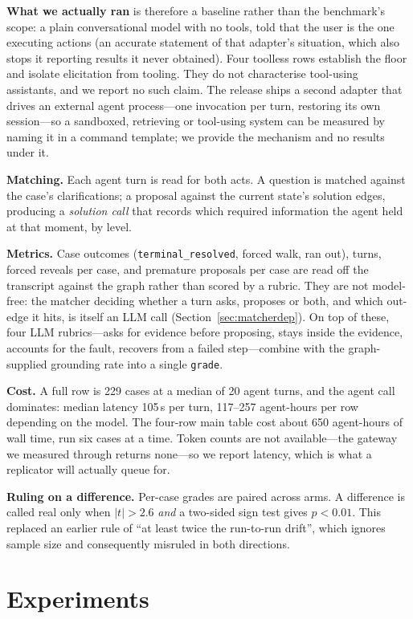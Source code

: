 \documentclass{article} %
\begin{document}
\textbf{What we actually ran} is therefore a baseline rather than the
benchmark's scope: a plain conversational model with no tools, told that
the user is the one executing actions (an accurate statement of that
adapter's situation, which also stops it reporting results it never
obtained). Four toolless rows establish the floor and isolate elicitation
from tooling. They do not characterise tool-using assistants, and we
report no such claim. The release ships a second adapter that drives an
external agent process---one invocation per turn, restoring its own
session---so a sandboxed, retrieving or tool-using system can be measured
by naming it in a command template; we provide the mechanism and no
results under it.

\textbf{Matching.} Each agent turn is read for both acts. A question is
matched against the case's clarifications; a proposal against the current
state's solution edges, producing a \emph{solution call} that records
which required information the agent held at that moment, by level.

\textbf{Metrics.} Case outcomes (\texttt{terminal\_resolved}, forced
walk, ran out), turns, forced reveals per case, and premature proposals
per case are read off the transcript against the graph rather than scored by a rubric. They are not model-free: the matcher deciding whether a turn asks, proposes or both, and which out-edge it hits, is itself an LLM call (Section~\ref{sec:matcherdep}). On top of these, four
LLM rubrics---asks for evidence before proposing, stays inside the
evidence, accounts for the fault, recovers from a failed step---combine
with the graph-supplied grounding rate into a single \texttt{grade}.

\textbf{Cost.} A full row is 229 cases at a median of 20 agent turns, and
the agent call dominates: median latency 105\,s per turn, 117--257
agent-hours per row depending on the model. The four-row main table cost
about 650 agent-hours of wall time, run six cases at a time. Token counts
are not available---the gateway we measured through returns none---so we
report latency, which is what a replicator will actually queue for.

\textbf{Ruling on a difference.} Per-case grades are paired across arms.
A difference is called real only when $|t| > 2.6$ \emph{and} a two-sided
sign test gives $p < 0.01$. This replaced an earlier rule of ``at least
twice the run-to-run drift'', which ignores sample size and consequently
misruled in both directions.

\section{Experiments}
\label{sec:exp}
\end{document}
